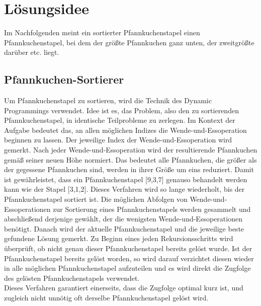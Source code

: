 \maketitle
\tableofcontents

\vspace{0.5cm}


\section{Lösungsidee}\label{sec:losungsidee}
Im Nachfolgenden meint ein sortierter Pfannkuchenstapel einen
Pfannkuchenstapel, bei dem der grö{\ss}te Pfannkuchen ganz unten,
der zweitgrö{\ss}te darüber etc. liegt. \\
\subsection{Pfannkuchen-Sortierer}\label{subsec:pfannkuchen-sortierer}
Um Pfannkuchenstapel zu sortieren, wird die Technik des Dynamic Programmings verwendet.
Idee ist es, das Problem, also den zu sortierenden Pfannkuchenstapel, in identische Teilprobleme zu zerlegen.
Im Kontext der Aufgabe bedeutet das, an allen möglichen Indizes die Wende-und-Essoperation beginnen zu lassen.
Der jeweilige Index der Wende-und-Essoperation wird gemerkt.
Nach jeder Wende-und-Essoperation wird der resultierende Pfannkuchen gemä{\ss} seiner neuen Höhe normiert.
Das bedeutet alle Pfannkuchen, die grö{\ss}er als der gegessene Pfannkuchen sind, werden in ihrer Grö{\ss}e um eins reduziert.
Damit ist gewährleistet, dass ein Pfannkuchenstapel [9,3,7] genauso behandelt werden kann wie der Stapel [3,1,2].
Dieses Verfahren wird so lange wiederholt, bis der Pfannkuchenstapel sortiert ist.
Die möglichen Abfolgen von Wende-und-Essoperationen zur Sortierung eines Pfannkuchenstapels werden gesammelt
und abschlie{\ss}end derjenige gewählt, der die wenigsten Wende-und-Essoperationen benötigt.
Danach wird der aktuelle Pfannkuchenstapel und die jeweilige beste gefundene Lösung gemerkt.
Zu Beginn eines jeden Rekursionsschritts wird überprüft, ob nicht genau dieser Pfannkuchenstapel bereits gelöst wurde.
Ist der Pfannkuchenstapel bereits gelöst worden, so wird darauf verzichtet diesen wieder in alle möglichen Pfannkuchenstapel
aufzuteilen und es wird direkt die Zugfolge des gelösten Pfannkuchenstapels verwendet. \\
Dieses Verfahren garantiert einerseits, dass die Zugfolge optimal kurz ist, und zugleich nicht unnötig
oft derselbe Pfannkuchenstapel gelöst wird. \\
